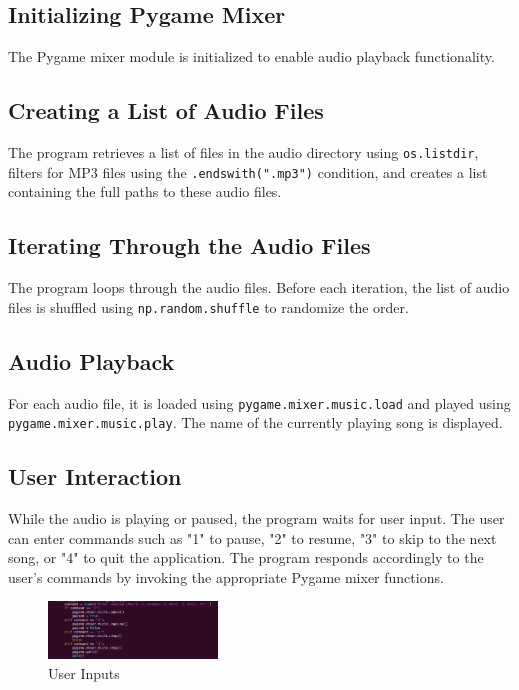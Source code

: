 \documentclass[journal,12pt,twocolumn]{IEEEtran}
\begin{document}
\subsection{Initializing Pygame Mixer}
The Pygame mixer module is initialized to enable audio playback functionality.

\subsection{Creating a List of Audio Files}
The program retrieves a list of files in the audio directory using \texttt{os.listdir}, filters for MP3 files using the \texttt{.endswith(".mp3")} condition, and creates a list containing the full paths to these audio files.

\subsection{Iterating Through the Audio Files}
The program loops through the audio files. Before each iteration, the list of audio files is shuffled using \texttt{np.random.shuffle} to randomize the order.

\subsection{Audio Playback}
For each audio file, it is loaded using \texttt{pygame.mixer.music.load} and played using \texttt{pygame.mixer.music.play}. The name of the currently playing song is displayed.

\subsection{User Interaction}
While the audio is playing or paused, the program waits for user input. The user can enter commands such as "1" to pause, "2" to resume, "3" to skip to the next song, or "4" to quit the application. The program responds accordingly to the user's commands by invoking the appropriate Pygame mixer functions.
\begin{figure}[h]
    \centering
    \includegraphics[width = 0.4\textwidth]{figs/fig3.png}
    \caption{User Inputs}
    \label{fig:my_label}
\end{figure}
\end{document}
